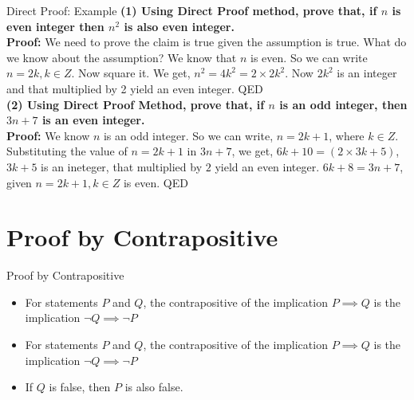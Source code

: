 \documentclass{beamer}
\begin{document}
\begin{frame}{Direct Proof: Example}
\textbf{(1) Using Direct Proof method, prove that, if $n$ is even integer then
$n^{2}$ is also even integer.}\\ \textbf{Proof:} We need to prove the claim is
true given the assumption is true. What do we know about the assumption? We know
that $n$ is even. So we can write $n=2k, k \in Z$. Now square it. We get,
$n^{2}=4k^{2}=2 \times 2k^{2}$. Now $2k^{2}$ is an integer and that multiplied
by 2 yield an even integer. QED\\ 

\textbf{(2) Using Direct Proof Method, prove that, if $n$ is an odd integer,
then $3n+7$ is an even integer.} \\ 
\textbf{Proof:} We know $n$ is an odd integer. So we can write, $n=2k+1$, where
$k \in Z$. Substituting the value of $n=2k+1$ in $3n+7$, we get, $6k+10=(2
\times 3k+5)$, $3k+5$ is an ineteger, that multiplied by $2$ yield an even
integer.  $6k+8=3n+7$, given $n=2k+1, k \in Z$ is even. QED 

\end{frame}


\section{Proof by Contrapositive}

\begin{frame}{Proof by Contrapositive}
\begin{itemize}
    \item For statements \( P \) and \( Q \), the contrapositive of the
    implication \( P \implies Q \) is the implication
$
\neg Q \implies \neg P
$
    \item For statements \( P \) and \( Q \), the contrapositive of the
    implication \( P \implies Q \) is the implication
$
\neg Q \implies \neg P
$
\item If $Q$  is false, then $ P$ is also false.
\end{itemize}
\end{frame}
\end{document}
